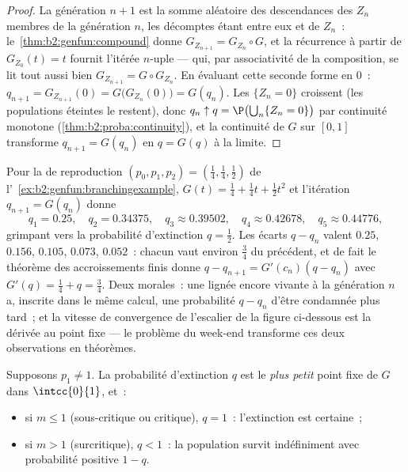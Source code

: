 \begin{proof}
La génération $n + 1$ est la somme aléatoire des descendances des
$Z_n$ membres de la génération $n$, les décomptes étant 
entre eux et de $Z_n$~: le~\cref{thm:b2:genfun:compound} donne $G_{Z_{n+1}} =
G_{Z_n} \circ G$, et la récurrence à partir de $G_{Z_0}(t) = t$
fournit l'itérée $n$-uple --- qui, par associativité de la
composition, se lit tout aussi bien $G_{Z_{n+1}} = G \circ G_{Z_n}$.
En évaluant cette seconde forme en $0$~: $q_{n+1} = G_{Z_{n+1}}(0) =
G\bigl(G_{Z_n}(0)\bigr) = G(q_n)$. Les  $\{Z_n = 0\}$
croissent (les populations éteintes le restent), donc $q_n \uparrow q
= \P\bigl(\bigcup_n\{Z_n = 0\}\bigr)$
par continuité monotone (\cref{thm:b2:proba:continuity}), et la
continuité de $G$ sur $[0, 1]$ transforme $q_{n+1} = G(q_n)$ en $q =
G(q)$ à la limite.
\end{proof}

\begin{example}
\label{ex:b2:genfun:cobwebnumerics}
Pour la  de reproduction $(p_0, p_1, p_2) = (\tfrac14,
\tfrac14, \tfrac12)$ de l'~\cref{ex:b2:genfun:branchingexample},
$G(t) = \tfrac14 + \tfrac14t + \tfrac12t^2$ et l'itération
$q_{n+1} = G(q_n)$ donne
\[
q_1 = 0.25, \quad q_2 = 0.34375, \quad q_3 \approx 0.39502,
\quad q_4 \approx 0.42678, \quad q_5 \approx 0.44776,
\]
grimpant vers la probabilité d'extinction $q = \tfrac12$.
Les écarts $q - q_n$ valent $0.25$, $0.156$, $0.105$, $0.073$,
$0.052$~: chacun vaut environ $\tfrac34$ du précédent, et
de fait le théorème des accroissements finis donne $q - q_{n+1} =
G'(c_n)(q - q_n)$ avec $G'(q) = \tfrac14 + q = \tfrac34$. Deux
morales~: une lignée encore vivante à la génération $n$ a, inscrite
dans le même calcul, une probabilité $q - q_n$ d'être condamnée plus
tard~; et la vitesse de convergence de l'escalier de la figure
ci-dessous est la dérivée au point fixe --- le
problème du week-end transforme ces deux observations en théorèmes.
\end{example}

\begin{theorem}\label{thm:b2:genfun:extinction}
Supposons $p_1 \neq 1$. La probabilité d'extinction $q$ est le
\emph{plus petit} point fixe de $G$ dans $\intcc{0}{1}$, et~:
\begin{itemize}
\item si $m \leq 1$ (sous-critique ou critique), $q = 1$~: l'extinction
est certaine~;
\item si $m > 1$ (surcritique), $q < 1$~: la population survit
indéfiniment avec probabilité positive $1 - q$.
\end{itemize}
\end{theorem}

